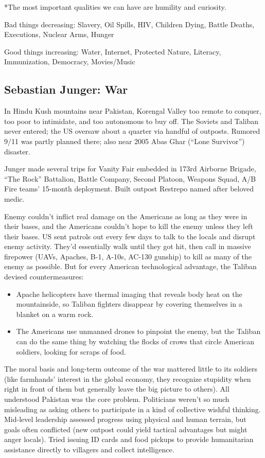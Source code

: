 \documentclass[
]{article}
\begin{document}
*The most important qualities we can have are humility and curiosity.

Bad things decreasing: Slavery, Oil Spills, HIV, Children Dying, Battle
Deaths, Executions, Nuclear Arms, Hunger

Good things increasing: Water, Internet, Protected Nature, Literacy,
Immunization, Democracy, Movies/Music

\hypertarget{sebastian-junger-war}{%
\subsection{Sebastian Junger: War}\label{sebastian-junger-war}}

In Hindu Kush mountains near Pakistan, Korengal Valley too remote to
conquer, too poor to intimidate, and too autonomous to buy off. The
Soviets and Taliban never entered; the US oversaw about a quarter via
handful of outposts. Rumored 9/11 was partly planned there; also near
2005 Abas Ghar (``Lone Survivor'') disaster.

Junger made several trips for Vanity Fair embedded in 173rd Airborne
Brigade, ``The Rock'' Battalion, Battle Company, Second Platoon, Weapons
Squad, A/B Fire teams' 15-month deployment. Built outpost Restrepo named
after beloved medic.

Enemy couldn't inflict real damage on the Americans as long as they were
in their bases, and the Americans couldn't hope to kill the enemy unless
they left their bases. US sent patrols out every few days to talk to the
locals and disrupt enemy activity. They'd essentially walk until they
got hit, then call in massive firepower (UAVs, Apaches, B-1, A-10s,
AC-130 gunship) to kill as many of the enemy as possible. But for every
American technological advantage, the Taliban devised countermeasures:

\begin{itemize}
\item
  Apache helicopters have thermal imaging that reveals body heat on the
  mountainside, so Taliban fighters disappear by covering themselves in
  a blanket on a warm rock.
\item
  The Americans use unmanned drones to pinpoint the enemy, but the
  Taliban can do the same thing by watching the flocks of crows that
  circle American soldiers, looking for scraps of food.
\end{itemize}

The moral basis and long-term outcome of the war mattered little to its
soldiers (like farmhands' interest in the global economy, they recognize
stupidity when right in front of them but generally leave the big
picture to others). All understood Pakistan was the core problem.
Politicians weren't so much misleading as asking others to participate
in a kind of collective wishful thinking. Mid-level leadership assessed
progress using physical and human terrain, but goals often conflicted
(new outpost could yield tactical advantages but might anger locals).
Tried issuing ID cards and food pickups to provide humanitarian
assistance directly to villagers and collect intelligence.
\end{document}
